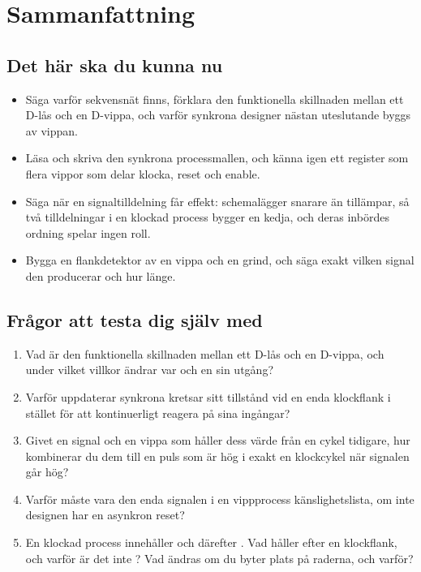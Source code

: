 
\section{Sammanfattning}
\label{c3:sec:review}

\subsection*{Det här ska du kunna nu}
\begin{itemize}
  \item Säga varför sekvensnät finns, förklara den funktionella skillnaden mellan ett D-lås och en
    D-vippa, och varför synkrona designer nästan uteslutande byggs av vippan.
  \item Läsa och skriva den synkrona processmallen, och känna igen ett register som flera vippor
    som delar klocka, reset och enable.
  \item Säga när en signaltilldelning får effekt: \code{<=} schemalägger snarare än tillämpar, så
    två tilldelningar i en klockad process bygger en kedja, och deras inbördes ordning spelar ingen
    roll.
  \item Bygga en flankdetektor av en vippa och en grind, och säga exakt vilken signal den
    producerar och hur länge.
\end{itemize}

\subsection*{Frågor att testa dig själv med}
\begin{enumerate}
  \item Vad är den funktionella skillnaden mellan ett D-lås och en D-vippa, och under vilket
    villkor ändrar var och en sin utgång?
  \item Varför uppdaterar synkrona kretsar sitt tillstånd vid en enda klockflank i stället för att
    kontinuerligt reagera på sina ingångar?
  \item Givet en signal och en vippa som håller dess värde från en cykel tidigare, hur kombinerar
    du dem till en puls som är hög i exakt en klockcykel när signalen går hög?
  \item Varför måste  vara den enda signalen i en vippprocess känslighetslista, om inte
    designen har en asynkron reset?
  \item En klockad process innehåller  och därefter . Vad håller
     efter en klockflank, och varför är det inte ? Vad ändras om du byter plats på
    raderna, och varför?
\end{enumerate}

